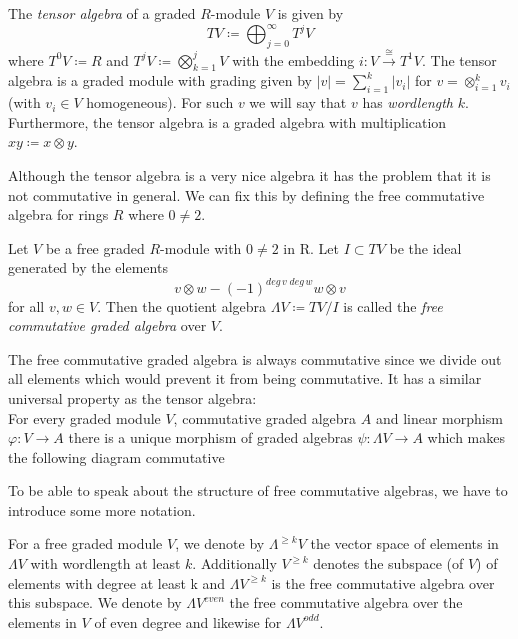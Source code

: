 \begin{Definition}
 The \emph{tensor algebra} of a graded $R$-module $V$ is given by
 $$ TV \coloneqq \bigoplus_{j = 0}^\infty T^j V$$
 where $T^0 V \coloneqq R$ and $T^j V \coloneqq \bigotimes_{k=1}^j V$ with the embedding 
 $i \colon V \overset{\cong}{\to} T^1 V$. \newline
 The tensor algebra is a graded module with grading given by
 $ |v| = \sum_{ i = 1}^k |v_i|$ for $ v = \otimes_{i = 1}^k v_i $ (with $v_i \in V$ homogeneous).
 For such $v$ we will say that $v$ has \emph{wordlength} $k$.
 Furthermore, the tensor algebra is a graded algebra with multiplication $xy \coloneqq x \otimes y$.
\end{Definition}

Although the tensor algebra is a very nice algebra it has the problem that it is not commutative in general. We can fix this by
defining the free commutative algebra for rings $R$ where $0 \neq 2$.

\begin{Definition}
 Let $V$ be a free graded $R$-module with $0 \neq 2$ in R. Let $I \subset TV$ be the ideal generated by the elements
 $$ v \otimes w - (-1)^{deg \, v \; deg \, w} w \otimes v$$
 for all $v,w \in V$. Then the quotient algebra $ \Lambda V \coloneqq TV/I$ is called the \emph{free commutative graded algebra} over $V$.
\end{Definition}

\begin{Remark}
 

The free commutative graded algebra is always commutative since we divide out all elements which would prevent it 
from being commutative. It has a similar universal property as the tensor algebra: \\ For every graded
module $V$, commutative graded algebra $A$ and linear morphism $\varphi \colon V \to A$ there is a unique morphism of
graded algebras $\psi \colon \Lambda V \to A$ which makes the following diagram commutative

 

\centerline{
}
\end{Remark}

To be able to speak about the structure of free commutative algebras, we have to introduce some more notation.

\begin{Definition}
For a free graded module $V$, we denote 
by $\Lambda^{\geq k} V$ the vector space of elements in $\Lambda V$ with wordlength at least $k$.
Additionally $V^{\geq k}$ denotes the subspace (of $V$) of elements with degree at least k and ${\Lambda V}^{\geq k}$ 
is the free commutative algebra over this subspace. We denote by $\Lambda V^{even}$ the free commutative algebra over the elements in $V$ of even degree
and likewise for $\Lambda V^{odd}$.
 
\end{Definition}

